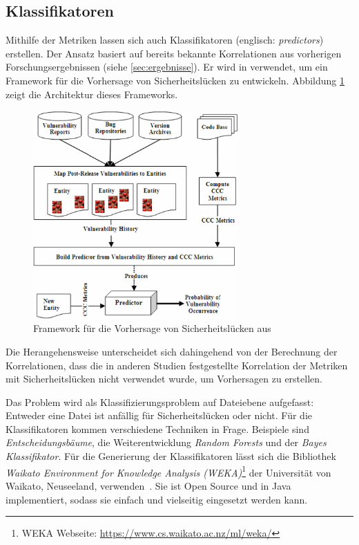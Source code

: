 \subsection{Klassifikatoren}
Mithilfe der Metriken lassen sich auch Klassifikatoren (englisch: \emph{predictors}) erstellen.
Der Ansatz basiert auf bereits bekannte Korrelationen aus vorherigen Forschungsergebnissen (siehe \ref{sec:ergebnisse}).
Er wird in \cite{chowdhury_zulkernine_2009} verwendet, um ein Framework für die Vorhersage von Sicherheitslücken zu entwickeln.
Abbildung \ref{fig:framework} zeigt die Architektur dieses Frameworks.
\begin{figure}
	\centering
	\includegraphics[width=0.7\textwidth]{img/framework.png}
	\caption{Framework für die Vorhersage von Sicherheitslücken aus \cite{chowdhury_zulkernine_2009}}
	\label{fig:framework}
\end{figure}
Die Herangehensweise unterscheidet sich dahingehend von der Berechnung der Korrelationen, dass die in anderen Studien festgestellte Korrelation der Metriken mit Sicherheitslücken nicht verwendet wurde, um Vorhersagen zu erstellen.

Das Problem wird als Klassifizierungsproblem auf Dateiebene aufgefasst:
Entweder eine Datei ist anfällig für Sicherheitslücken oder nicht.
Für die Klassifikatoren kommen verschiedene Techniken in Frage.
Beispiele sind \emph{Entscheidungsbäume}\cite{decision_trees}, die Weiterentwicklung \emph{Random Forests} und der \emph{Bayes Klassifikator}.
Für die Generierung der Klassifikatoren lässt sich die Bibliothek \emph{Waikato Environment for Knowledge Analysis (WEKA)}\footnote{WEKA Webseite: \url{https://www.cs.waikato.ac.nz/ml/weka/}} der Universität von Waikato, Neuseeland, verwenden~\cite{chowdhury_zulkernine_2009}.
Sie ist Open Source und in Java implementiert, sodass sie einfach und vielseitig eingesetzt werden kann.


